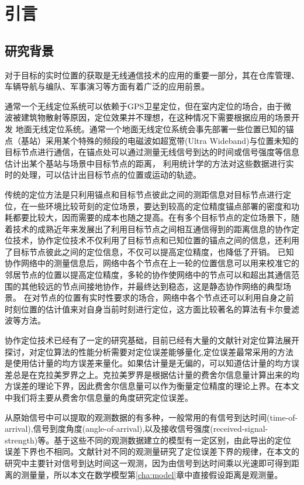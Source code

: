 \chapter{引言}
\label{cha:intro}

\section{研究背景}
对于目标的实时位置的获取是无线通信技术的应用的重要一部分\cite{indoorPos}，其在仓库管理、车辆导航与编队、军事演习等方面有着广泛的应用前景。


通常一个无线定位系统可以依赖于GPS卫星定位，但在室内定位的场合，由于微波被建筑物散射等原因，定位效果并不理想，在这种情况下需要根据应用的场景开发
地面无线定位系统。通常一个地面无线定位系统会事先部署一些位置已知的锚点（基站）采用某个特殊的频段的电磁波如超宽带(Ultra Wideband)与位置未知的目标节点进行通信，在锚点处可以通过测量无线信号到达的时间或信号强度等信息估计出某个基站与场景中目标节点的距离，
利用统计学的方法对这些数据进行实时的处理，可以估计出目标节点的位置或运动的轨迹。


传统的定位方法是只利用锚点和目标节点彼此之间的测距信息对目标节点进行定位，在一些环境比较苛刻的定位场景，要达到较高的定位精度锚点部署的密度和功耗都要比较大，因而需要的成本也随之提高。在有多个目标节点的定位场景下，随着技术的成熟近年来发展出了利用目标节点之间相互通信得到的距离信息的协作定位技术，协作定位技术不仅利用了目标节点和已知位置的锚点之间的信息，还利用了目标节点彼此之间的定位信息，不仅可以提高定位精度，也降低了开销。
已知协作网络中的测量信息后，网络中各个节点在上一轮的位置信息可以用来校准它的邻居节点的位置以提高定位精度，多轮的协作使网络中的节点可以和超出其通信范围的其他较远的节点间接地协作，并最终达到稳态，这是静态协作网络的典型场景。
在对节点的位置有实时性要求的场合，网络中各个节点还可以利用自身之前时刻位置的估计值来对自身当前时刻进行定位，这方面比较著名的算法有卡尔曼滤波\cite{KF}等方法。

协作定位技术已经有了一定的研究基础，目前已经有大量的文献针对定位算法展开探讨，对定位算法的性能分析需要对定位误差能够量化,定位误差最常采用的方法是使用估计量的均方误差来量化。如果估计量是无偏的，可以知道估计量的均方误差总是在克拉美罗界之上\cite{siyi}。克拉美罗界是根据估计量的费舍尔信息量计算出来的均方误差的理论下界，因此费舍尔信息量可以作为衡量定位精度的理论上界。在本文中我们将主要从费舍尔信息量的角度研究定位误差。

从原始信号中可以提取的观测数据的有多种，一般常用的有信号到达时间(time-of-arrival),信号到度角度(angle-of-arrival),以及接收信号强度(received-signal-strength)等。基于这些不同的观测数据建立的模型有一定区别，由此导出的定位误差下界也不相同。文献\cite{LimitBound}针对不同的观测量研究了定位误差下界的规律，在本文的研究中主要针对信号到达时间这一观测，因为由信号到达时间乘以光速即可得到距离的测量量，所以本文在数学模型第\ref{cha:model}章中直接假设距离是观测量。

